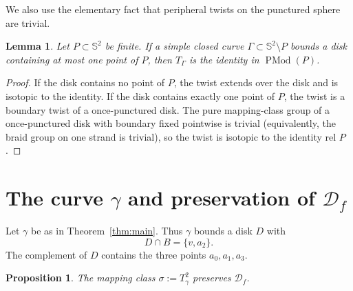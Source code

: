 \documentclass[11pt]{article}
\newtheorem{lemma}[theorem]{Lemma}
\newtheorem{proposition}[theorem]{Proposition}
\newcommand{\Sph}{\mathbb S^2}
\newcommand{\D}{\mathcal D}
\newcommand{\PMod}{\operatorname{PMod}}
\begin{document}
We also use the elementary fact that peripheral twists on the punctured sphere are trivial.

\begin{lemma}\label{lem:peripheral}
Let $P\subset\Sph$ be finite.  If a simple closed curve $\Gamma\subset\Sph\setminus P$ bounds a disk containing at most one point of $P$, then $T_\Gamma$ is the identity in $\PMod(P)$.
\end{lemma}

\begin{proof}
If the disk contains no point of $P$, the twist extends over the disk and is isotopic to the identity.  If the disk contains exactly one point of $P$, the twist is a boundary twist of a once-punctured disk.  The pure mapping-class group of a once-punctured disk with boundary fixed pointwise is trivial (equivalently, the braid group on one strand is trivial), so the twist is isotopic to the identity rel $P$.
\end{proof}

\section{The curve $\gamma$ and preservation of $\D_f$}

Let $\gamma$ be as in Theorem~\ref{thm:main}.  Thus $\gamma$ bounds a disk $D$ with
\[
  D\cap B=\{v,a_2\}.
\]
The complement of $D$ contains the three points $a_0,a_1,a_3$.

\begin{proposition}\label{prop:preserve}
The mapping class $\sigma:=T_\gamma^2$ preserves $\D_f$.
\end{proposition}
\end{document}
